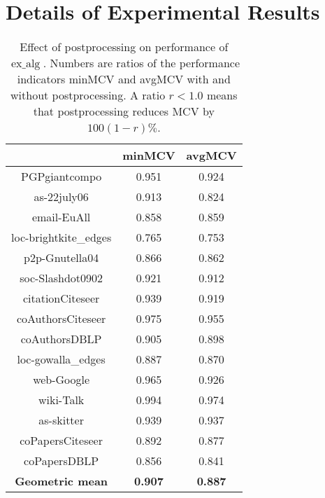 \documentclass[pdftex]{llncs}
\newcommand{\exalg}{\operatorname{ex\_alg}}
\numberwithin{equation}{section}
\numberwithin{example}{section}
\numberwithin{table}{section}
\begin{document}
\section{Details of Experimental Results}
\label{sec:exp-apx}



\begin{table}[tb]
  \caption{Effect of postprocessing on performance of $\exalg$. Numbers are ratios of
    the performance indicators minMCV and avgMCV with and without
    postprocessing. A ratio $r < 1.0$ means that postprocessing
    reduces MCV by $100 (1-r) \%$.}
\begin{center}
\begin{tabular}{c | c  c}
                             & minMCV              &  avgMCV               \\\hline \hline
PGPgiantcompo                &  0.951              &   0.924               \\ \hline
as-22july06                  &  0.913              &   0.824               \\ \hline
email-EuAll                  &  0.858              &   0.859               \\ \hline
loc-brightkite\_edges        &  0.765              &   0.753               \\ \hline
p2p-Gnutella04               &  0.866              &   0.862               \\ \hline
soc-Slashdot0902             &  0.921              &   0.912               \\ \hline
citationCiteseer             &  0.939              &   0.919               \\ \hline
coAuthorsCiteseer            &  0.975              &   0.955               \\ \hline 
coAuthorsDBLP                &  0.905              &   0.898               \\ \hline
loc-gowalla\_edges           &  0.887              &   0.870               \\ \hline
web-Google                   &  0.965              &   0.926               \\ \hline
wiki-Talk                    &  0.994              &   0.974               \\ \hline
as-skitter                   &  0.939              &   0.937               \\ \hline
coPapersCiteseer             &  0.892              &   0.877               \\ \hline
coPapersDBLP                 &  0.856              &   0.841               \\ \hline  \hline
\textbf{Geometric mean}	     & \textbf{0.907}      & \textbf{0.887}        \\ \hline
\end{tabular}
\end{center}
\label{tab:PPgainsMCV}
\end{table}
\end{document}
